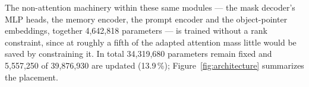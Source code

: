 \documentclass[11pt,a4paper]{article}
\begin{document}
The non-attention machinery within these same modules --- the mask decoder's
MLP heads, the memory encoder, the prompt encoder and the object-pointer
embeddings, together 4{,}642{,}818 parameters --- is trained without a rank
constraint, since at roughly a fifth of the adapted attention mass little
would be saved by constraining it. In total 34{,}319{,}680 parameters remain
fixed and 5{,}557{,}250 of 39{,}876{,}930 are updated (13.9\,\%);
Figure~\ref{fig:architecture} summarizes the placement.

%
%
\end{document}
